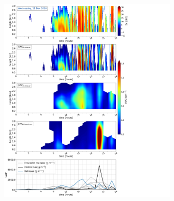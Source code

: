 	\begin{figure}%
		\centering
		\begin{subfigure}[b]{0.8\textwidth}
			\includegraphics[trim={0.5cm 0.5cm 17.5cm .5cm},clip,width=\textwidth]{./fig_SWC/20161221}
			\caption{}\label{fig:SWC21}
		\end{subfigure}
	\end{figure}
